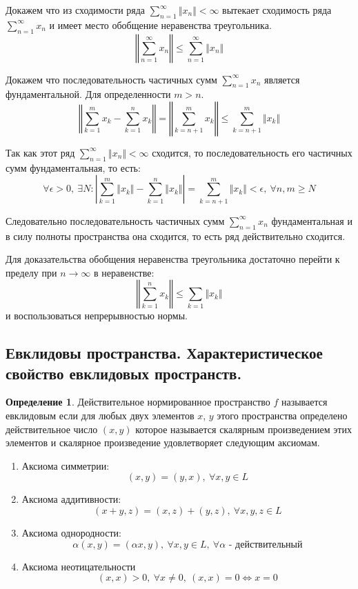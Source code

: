 \documentclass[14pt]{extarticle}
\theoremstyle{definition}
\newtheorem{definition}{Определение}[section]
\theoremstyle{remark}
\newcommand{\be}{\begin{enumerate}}
\newcommand{\ee}{\end{enumerate}}
\renewcommand{\[}{\begin{dmath*}[compact]}
\renewcommand{\]}{\end{dmath*}}
\newcommand{\sep}{ , \ \allowbreak }
\begin{document}
Докажем что из сходимости ряда $\sum_{n=1}^\infty \Vert x_n \Vert < \infty$
вытекает сходимость ряда $\sum_{n=1}^\infty x_n$ и имеет место обобщение
неравенства треугольника.
\[ \left \Vert \sum_{n=1}^\infty x_n \right \Vert \leq
\sum_{n=1}^\infty \Vert x_n \Vert  \]

Докажем что последовательность частичных сумм $\sum_{n=1}^\infty x_n$ является
фундаментальной.
Для определенности $m>n$.
\[ {\left \Vert \sum_{k=1}^m x_k - \sum_{k=1}^n x_k \right \Vert} \allowbreak
= {\left \Vert \sum_{k=n+1}^m x_k \right \Vert} \allowbreak
\leq {\sum_{k=n+1}^m \Vert x_k \Vert} \]

Так как этот ряд $\sum_{n=1}^\infty \Vert x_n \Vert < \infty$ сходится,
то последовательность его частичных сумм фундаментальная, то есть:
\[ {\forall \epsilon > 0} \sep \exists N:
{\left| \sum_{k=1}^m \Vert x_k \Vert - \sum_{k=1}^n \Vert x_k \Vert \right|}
\allowbreak = {\sum_{k=n+1}^m \Vert x_k \Vert < \epsilon}
\sep {\forall n,m \geq N} \]

Следовательно последовательность частичных сумм $\sum_{n=1}^\infty x_n$
фундаментальная и в силу полноты пространства она сходится,
то есть ряд действительно сходится.

Для доказательства обобщения неравенства треугольника достаточно перейти к
пределу при $n \to \infty$ в неравенстве:
\[ \left \Vert \sum_{k=1}^n x_k \right \Vert \leq \sum_{k=1} \Vert x_k \Vert \]
и воспользоваться непрерывностью нормы.

\subsection{Евклидовы пространства.
Характеристическое свойство евклидовых пространств.}

\begin{definition}
  Действительное нормированное пространство $f$ называется евклидовым если
  для любых двух элементов $x$, $y$ этого пространства определено
  действительное число $(x,y)$ которое называется скалярным произведением
  этих элементов и скалярное произведение удовлетворяет следующим аксиомам.

  \be
    \item Аксиома симметрии:
    \[(x,y)=(y,x) \sep {\forall x,y \in L}\]

    \item Аксиома аддитивности:
    \[ (x + y, z) = (x,z) + (y,z) \sep {\forall x,y,z \in L} \]

    \item Аксиома однородности:
    \[\alpha (x,y) = (\alpha x,y) \sep {\forall x,y \in L} \sep
    {\forall \alpha \text{ - действительный}} \]

    \item Аксиома неотицательности
    \[ (x,x) > 0 \sep\forall x\neq 0 \sep {(x,x)=0 \Leftrightarrow x=0} \]
  \ee
\end{definition}
\end{document}
